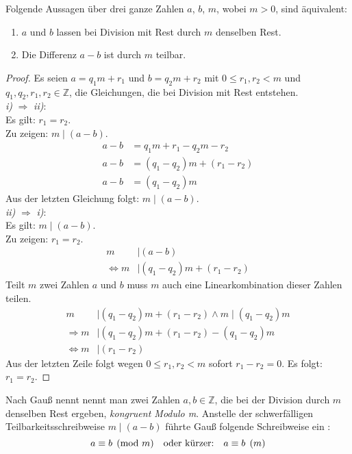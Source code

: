 \begin{lemma}
  Folgende Aussagen über drei ganze Zahlen $a$, $b$, $m$, wobei $m > 0$, sind äquivalent:
  \begin{enumerate}[label=\roman*)]
    \item $a$ und $b$ lassen bei Division mit Rest durch $m$ denselben Rest.
    \item Die Differenz $a - b$ ist durch $m$ teilbar.
  \end{enumerate}
\end{lemma}
\begin{proof}
  Es seien $a = q_1m + r_1$ und $b = q_2m + r_2$ mit $0 \leq r_1,r_2 < m$
  und  $q_1,q_2,r_1,r_2 \in \mathbb{Z}$, die Gleichungen,
  die bei Division mit Rest entstehen. \\
  \textit{i)} $\Rightarrow$ \textit{ii)}: \\
  Es gilt: $r_1 = r_2$. \\
  Zu zeigen: $m \mid (a-b)$.
  \begin{align*}
    a - b & = q_1m + r_1 - q_2m - r_2    \\
    a - b & = (q_1 - q_2)m + (r_1 - r_2) \\
    a - b & = (q_1 - q_2)m
  \end{align*}
  Aus der letzten Gleichung folgt: $m \mid (a - b)$. \\
  \textit{ii)} $\Rightarrow$ \textit{i)}: \\
  Es gilt: $m \mid (a - b)$. \\
  Zu zeigen: $r_1 = r_2$.
  \begin{align*}
    m                 & \mid (a - b)                    \\
    \Leftrightarrow m & \mid (q_1 - q_2)m + (r_1 - r_2)
  \end{align*}
  Teilt $m$ zwei Zahlen $a$ und $b$ muss $m$ auch eine Linearkombination dieser Zahlen teilen.
  \begin{align*}
    m                 & \mid (q_1 - q_2)m + (r_1 - r_2) \wedge m \mid (q_1 - q_2)m \\
    \Rightarrow m     & \mid (q_1 - q_2)m + (r_1 - r_2) - (q_1 - q_2)m             \\
    \Leftrightarrow m & \mid (r_1 - r_2)
  \end{align*}
  Aus der letzten Zeile folgt wegen $0 \leq r_1,r_2 < m$ sofort $r_1 - r_2 = 0$.
  Es folgt: $r_1 = r_2$.
\end{proof}

\noindent
Nach Gauß nennt nennt man zwei Zahlen $a, b \in \mathbb{Z}$, die bei der Division durch $m$
denselben Rest ergeben, \textit{kongruent Modulo m}. Anstelle der schwerfälligen
Teilbarkeitsschreibweise $m \mid (a - b)$
führte Gauß folgende Schreibweise ein \parencite[180]{BOOK:numberTheory}:
\begin{equation}
  \label{eq:kongruenz}
  a \equiv b \pmod{m} \text{\quad oder kürzer:\quad} a \equiv b \pod{m}
\end{equation}

